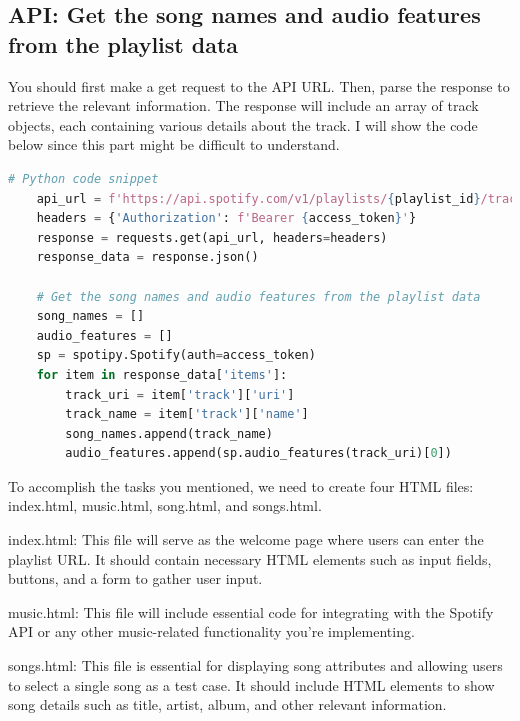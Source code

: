 \documentclass{article}
\begin{document}
\subsection{API: Get the song names and audio features from the playlist data}
You should first make a get request to the API URL. Then, parse the response to retrieve the relevant information. The response will include an array of track objects, each containing various details about the track. I will show the code below since this part might be difficult to understand.
\begin{lstlisting}[language=Python]
# Python code snippet
    api_url = f'https://api.spotify.com/v1/playlists/{playlist_id}/tracks'
    headers = {'Authorization': f'Bearer {access_token}'}
    response = requests.get(api_url, headers=headers)
    response_data = response.json()

    # Get the song names and audio features from the playlist data
    song_names = []
    audio_features = []
    sp = spotipy.Spotify(auth=access_token)
    for item in response_data['items']:
        track_uri = item['track']['uri']
        track_name = item['track']['name']
        song_names.append(track_name)
        audio_features.append(sp.audio_features(track_uri)[0])

\end{lstlisting}
To accomplish the tasks you mentioned, we need to create four HTML files: index.html, music.html, song.html, and songs.html.

index.html: This file will serve as the welcome page where users can enter the playlist URL. It should contain necessary HTML elements such as input fields, buttons, and a form to gather user input.

music.html: This file will include essential code for integrating with the Spotify API or any other music-related functionality you're implementing. 

songs.html: This file is essential for displaying song attributes and allowing users to select a single song as a test case. It should include HTML elements to show song details such as title, artist, album, and other relevant information.
\end{document}
